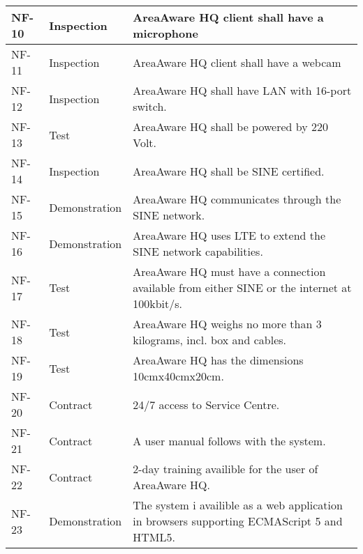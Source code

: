 \begin{longtable}{| p{2.4cm}  | p{2.6cm} | p{6.6cm} |  }
	NF-10	& Inspection	& AreaAware HQ client shall have a microphone \\ \hline
	NF-11	& Inspection	& AreaAware HQ client shall have a webcam \\ \hline
	NF-12	& Inspection	& AreaAware HQ shall have LAN with 16-port switch. \\ \hline
	NF-13	& Test			& AreaAware HQ shall be powered by 220 Volt. \\ \hline
	NF-14	& Inspection	& AreaAware HQ shall be SINE certified. \\ \hline
	NF-15	& Demonstration	& AreaAware HQ communicates through the SINE network. \\ \hline
	NF-16	& Demonstration	& AreaAware HQ uses LTE to extend the SINE network capabilities. \\ \hline
	NF-17	& Test			& AreaAware HQ must have a connection available from either SINE or the internet at 100kbit/s. \\ \hline
	NF-18	& Test			& AreaAware HQ weighs no more than 3 kilograms, incl. box and cables. \\ \hline
	NF-19	& Test			& AreaAware HQ has the dimensions 10cmx40cmx20cm. \\ \hline
	NF-20	& Contract		& 24/7 access to Service Centre. \\ \hline
	NF-21	& Contract		& A user manual follows with the system. \\ \hline
	NF-22	& Contract		& 2-day training availible for the user of AreaAware HQ. \\ \hline
	NF-23	& Demonstration	& The system i availible as a web application in browsers supporting ECMAScript 5 and HTML5. \\ \hline
	
\end{longtable}